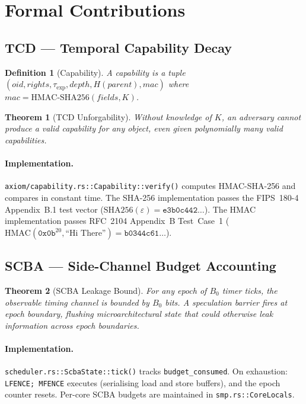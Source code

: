 \documentclass[10pt,twocolumn]{article}
\newtheorem{theorem}{Theorem}
\newtheorem{definition}{Definition}
\begin{document}
\section{Formal Contributions}

\subsection{TCD --- Temporal Capability Decay}

\begin{definition}[Capability]
A capability is a tuple $(\mathit{oid}, \mathit{rights}, \tau_{\exp},
\mathit{depth}, H(\mathit{parent}), \mathit{mac})$ where
$\mathit{mac} = \mathrm{HMAC\text{-}SHA256}(\mathit{fields}, K)$.
\end{definition}

\begin{theorem}[TCD Unforgability]
Without knowledge of $K$, an adversary cannot produce a valid capability
for any object, even given polynomially many valid capabilities.
\end{theorem}

\paragraph{Implementation.} \texttt{axiom/capability.rs::Capability::verify()}
computes HMAC-SHA-256 and compares in constant time. The SHA-256
implementation passes the FIPS~180-4 Appendix~B.1 test vector
($\mathrm{SHA256}(\varepsilon) = \texttt{e3b0c442\ldots}$).
The HMAC implementation passes RFC~2104 Appendix~B Test~Case~1
($\mathrm{HMAC}(\texttt{0x0b}^{20}, \text{``Hi There''}) = \texttt{b0344c61\ldots}$).

\subsection{SCBA --- Side-Channel Budget Accounting}

\begin{theorem}[SCBA Leakage Bound]
For any epoch of $B_0$ timer ticks, the observable timing channel is
bounded by $B_0$ bits. A speculation barrier fires at epoch boundary,
flushing microarchitectural state that could otherwise leak information
across epoch boundaries.
\end{theorem}

\paragraph{Implementation.} \texttt{scheduler.rs::ScbaState::tick()} tracks
\texttt{budget\_consumed}. On exhaustion: \texttt{LFENCE; MFENCE} executes
(serialising load and store buffers), and the epoch counter resets.
Per-core SCBA budgets are maintained in \texttt{smp.rs::CoreLocals}.
\end{document}
